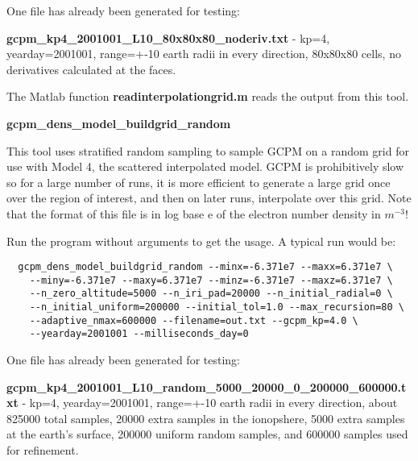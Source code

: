 \documentclass[10pt]{article}
\begin{document}
One file has already been generated for testing:

{\bf gcpm\_kp4\_2001001\_L10\_80x80x80\_noderiv.txt} - kp=4,
yearday=2001001, range=+-10 earth radii in every direction,
80x80x80 cells, no derivatives calculated at the faces.

The Matlab function {\bf readinterpolationgrid.m} reads the output
from this tool.  

{\bf gcpm\_dens\_model\_buildgrid\_random}

This tool uses stratified random sampling to sample GCPM on a random
grid for use with Model 4, the scattered interpolated model.  GCPM is
prohibitively slow so for a large number of runs, it is more efficient
to generate a large grid once over the region of interest, and then on
later runs, interpolate over this grid.  Note that the format of this
file is in log base e of the electron number density in $m^{-3}$!

Run the program without arguments to get the usage.  A typical run
would be:
\begin{verbatim}
  gcpm_dens_model_buildgrid_random --minx=-6.371e7 --maxx=6.371e7 \
    --miny=-6.371e7 --maxy=6.371e7 --minz=-6.371e7 --maxz=6.371e7 \
    --n_zero_altitude=5000 --n_iri_pad=20000 --n_initial_radial=0 \
    --n_initial_uniform=200000 --initial_tol=1.0 --max_recursion=80 \
    --adaptive_nmax=600000 --filename=out.txt --gcpm_kp=4.0 \
    --yearday=2001001 --milliseconds_day=0
\end{verbatim}

One file has already been generated for testing:

{\bf gcpm\_kp4\_2001001\_L10\_random\_5000\_20000\_0\_200000\_600000.txt} - kp=4,
yearday=2001001, range=+-10 earth radii in every direction,
about 825000 total samples, 20000 extra samples in the ionopshere,
5000 extra samples at the earth's surface, 200000 uniform random
samples, and 600000 samples used for refinement.
\end{document}
